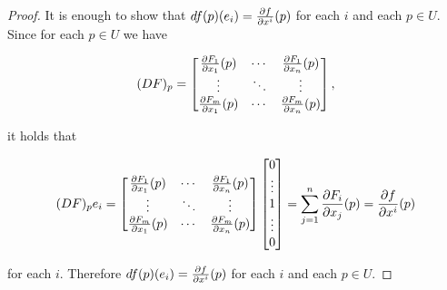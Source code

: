 \begin{proof}

It is enough to show that \(df(p)(e_i) = \pderiv{f}{x^i}(p) \) for each \(i\) and each \(p \in U\). Since for each \(p \in U\) we have

\[
(DF)_p =\begin{bmatrix} \pderiv{F_1}{x_1}(p) & \cdots & \pderiv{F_1}{x_n}(p) \\
\vdots & \ddots & \vdots \\
\pderiv{F_m}{x_1}(p) & \cdots & \pderiv{F_m}{x_n}(p) \end{bmatrix},
\]

it holds that

\[
(DF)_pe_i  = \begin{bmatrix} \pderiv{F_1}{x_1}(p) & \cdots & \pderiv{F_1}{x_n}(p) \\
\vdots & \ddots & \vdots \\
\pderiv{F_m}{x_1}(p) & \cdots & \pderiv{F_m}{x_n}(p) \end{bmatrix} \begin{bmatrix} 0 \\ \vdots \\ 1 \\ \vdots \\ 0 \end{bmatrix}= \sum_{j=1}^n \pderiv{F_i}{x_j}(p)=  \pderiv{f}{x^i}(p) 
\]

for each \(i\). Therefore \(df(p)(e_i) = \pderiv{f}{x^i}(p) \) for each \(i\) and each \(p \in U\).
\end{proof}

